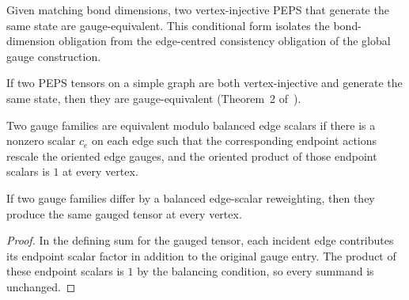 \begin{theorem}%
    \label{thm:fundamentalTheorem_PEPS_of_bondDim}
    \notready
    Given matching bond dimensions, two vertex-injective PEPS that generate the
    same state are gauge-equivalent. This conditional form isolates the
    bond-dimension obligation from the edge-centred consistency obligation of
    the global gauge construction.
\end{theorem}

\begin{theorem}%
    \label{thm:fundamentalTheorem_PEPS}
    \notready
    If two PEPS tensors on a simple graph are both vertex-injective and
    generate the same state, then they are gauge-equivalent
    (Theorem~2 of~\cite{Molnar2018NormalPEPS}).
\end{theorem}

\begin{definition}%
    \label{def:GaugeEquivModEdgeScalars}
    \leanok
    Two gauge families are equivalent modulo balanced edge scalars if there is
    a nonzero scalar $c_e$ on each edge such that the corresponding endpoint
    actions rescale the oriented edge gauges, and the oriented product of those
    endpoint scalars is $1$ at every vertex.
\end{definition}

\begin{theorem}%
    \label{thm:GaugeEquivModEdgeScalars_gaugeVertex_eq}
    \leanok
    If two gauge families differ by a balanced edge-scalar reweighting, then
    they produce the same gauged tensor at every vertex.
\end{theorem}

\begin{proof}\leanok{}
    In the defining sum for the gauged tensor, each incident edge contributes
    its endpoint scalar factor in addition to the original gauge entry.
    The product of these endpoint scalars is $1$ by the balancing condition,
    so every summand is unchanged.
\end{proof}

